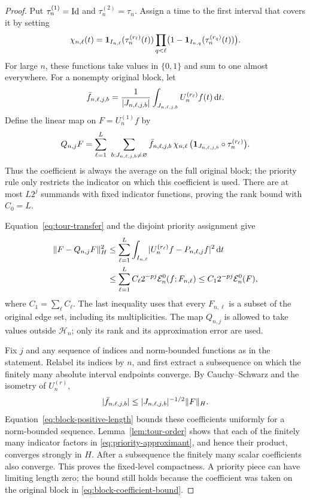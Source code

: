 \begin{proof}
Put \(\tau_n^{(1)}=\operatorname{Id}\) and \(\tau_n^{(2)}=\tau_n\).  Assign a time to
the first interval that covers it by setting
\[
 \chi_{n,\ell}(t)=
 \mathbf 1_{I_{n,\ell}}(\tau_n^{(r_\ell)}(t))
 \prod_{q<\ell}\bigl(1-
       \mathbf 1_{I_{n,q}}(\tau_n^{(r_q)}(t))\bigr).
\]
For large \(n\), these functions take values in \(\{0,1\}\) and sum to
one almost everywhere.  For a nonempty original block, let
\[
 \bar f_{n,\ell,j,b}=
 \frac{1}{\lvert J_{n,\ell,j,b}\rvert}
 \int_{J_{n,\ell,j,b}}U_n^{(r_\ell)}f(t)\,\mathrm d t.
\]
Define the linear map on \(F=U_n^{(1)}f\) by
\begin{equation}\label{eq:priority-approximant}
 Q_{n,j}F=
 \sum_{\ell=1}^L\ \sum_{b:J_{n,\ell,j,b}\ne\varnothing}
 \bar f_{n,\ell,j,b}\,
 \chi_{n,\ell}\,
 \bigl(\mathbf 1_{J_{n,\ell,j,b}}\circ\tau_n^{(r_\ell)}\bigr).
\end{equation}
Thus the coefficient is always the average on the full original block;
the priority rule only restricts the indicator on which this coefficient
is used.  There are at most \(L2^j\) summands with fixed indicator
functions, proving the rank bound with \(C_0=L\).

Equation~\eqref{eq:tour-transfer} and the disjoint priority assignment give
\begin{align*}
 \lVert F-Q_{n,j}F\rVert_H^2
 &\le \sum_{\ell=1}^L
       \int_{I_{n,\ell}}
          \lvert U_n^{(r_\ell)}f-P_{n,\ell,j}f\rvert^{2}\,\mathrm d t \\
 &\le \sum_{\ell=1}^L C_\ell2^{-pj}
                  \mathcal E_n^0(f;F_{n,\ell})
 \le C_1 2^{-pj}\mathcal E_n^0(F),
\end{align*}
where \(C_1=\sum_\ell C_\ell\).  The last inequality uses that every
\(F_{n,\ell}\) is a subset of the original edge set, including its
multiplicities.  The map \(Q_{n,j}\) is allowed to take values outside
\(\mathcal H_n\); only its rank and its approximation error are used.

Fix \(j\) and any sequence of indices and norm-bounded functions as in
the statement.  Relabel its indices by \(n\), and first extract a
subsequence on which the finitely many absolute interval endpoints
converge.  By Cauchy--Schwarz and the isometry of \(U_n^{(r)}\),
\begin{equation}\label{eq:block-coefficient-bound}
 \lvert \bar f_{n,\ell,j,b}\rvert
 \le \lvert J_{n,\ell,j,b}\rvert^{-1/2}\lVert F\rVert_H.
\end{equation}
Equation~\eqref{eq:block-positive-length} bounds these coefficients
uniformly for a norm-bounded sequence.  Lemma~\ref{lem:tour-order} shows
that each of the finitely many indicator factors in
\eqref{eq:priority-approximant}, and hence their product, converges strongly
in \(H\).  After a subsequence the finitely many scalar coefficients also
converge.  This proves the fixed-level compactness.  A priority piece can
have limiting length zero; the bound still holds because the coefficient
was taken on the original block in \eqref{eq:block-coefficient-bound}.


\end{proof}
